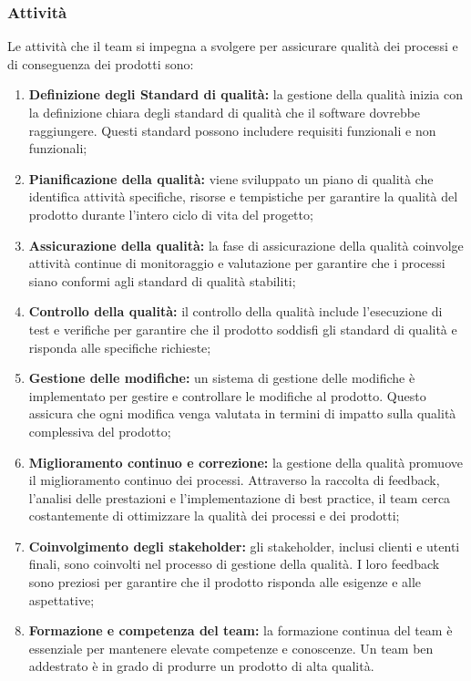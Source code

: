 \subsubsection{Attività}
Le attività che il team si impegna a svolgere per assicurare qualità dei processi e di conseguenza dei prodotti sono:
\begin{enumerate}
    \item \textbf{Definizione degli Standard di qualità:}
        la gestione della qualità inizia con la definizione chiara degli standard di qualità che il software dovrebbe raggiungere. Questi standard possono includere requisiti funzionali e non funzionali;

    \item \textbf{Pianificazione della qualità:}
        viene sviluppato un piano di qualità che identifica attività specifiche, risorse e tempistiche per garantire la qualità del prodotto durante l'intero ciclo di vita del progetto;

    \item \textbf{Assicurazione della qualità:}
        la fase di assicurazione della qualità coinvolge attività continue di monitoraggio e valutazione per garantire che i processi siano conformi agli standard di qualità stabiliti;

    \item \textbf{Controllo della qualità:}
        il controllo della qualità include l'esecuzione di test e verifiche per garantire che il prodotto soddisfi gli standard di qualità e risponda alle specifiche richieste;

    \item \textbf{Gestione delle modifiche:}
        un sistema di gestione delle modifiche è implementato per gestire e controllare le modifiche al prodotto. Questo assicura che ogni modifica venga valutata in termini di impatto sulla qualità complessiva del prodotto;

    \item \textbf{Miglioramento continuo e correzione:}
        la gestione della qualità promuove il miglioramento continuo dei processi. Attraverso la raccolta di feedback, l'analisi delle prestazioni e l'implementazione di best practice, il team cerca costantemente di ottimizzare la qualità dei processi e dei prodotti;

    \item \textbf{Coinvolgimento degli stakeholder:}
        gli stakeholder, inclusi clienti e utenti finali, sono coinvolti nel processo di gestione della qualità. I loro feedback sono preziosi per garantire che il prodotto risponda alle esigenze e alle aspettative;

    \item \textbf{Formazione e competenza del team:}
        la formazione continua del team è essenziale per mantenere elevate competenze e conoscenze. Un team ben addestrato è in grado di produrre un prodotto di alta qualità.
\end{enumerate}

